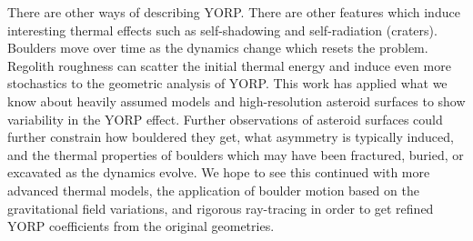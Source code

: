 There are other ways of describing YORP. There are other features which induce interesting thermal effects such as self-shadowing and self-radiation (craters). Boulders move over time as the dynamics change which resets the problem. Regolith roughness can scatter the initial thermal energy and induce even more stochastics to the geometric analysis of YORP. This work has applied what we know about heavily assumed models and high-resolution asteroid surfaces to show variability in the YORP effect. Further observations of asteroid surfaces could further constrain how bouldered they get, what asymmetry is typically induced, and the thermal properties of boulders which may have been fractured, buried, or excavated as the dynamics evolve. We hope to see this continued with more advanced thermal models, the application of boulder motion based on the gravitational field variations, and rigorous ray-tracing in order to get refined YORP coefficients from the original geometries. 
